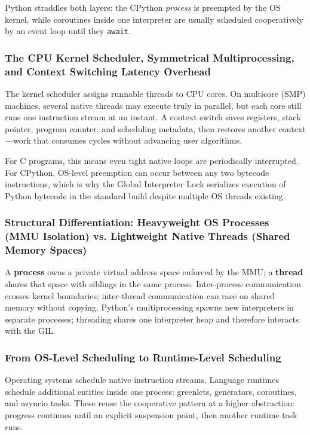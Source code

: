 \documentclass[a4paper,twoside]{report}
\begin{document}
Python straddles both layers: the CPython \emph{process} is preempted by the OS kernel, while coroutines inside one interpreter are usually scheduled cooperatively by an event loop until they \texttt{await}.

\subsubsection{The CPU Kernel Scheduler, Symmetrical Multiprocessing, and Context Switching Latency Overhead}

The kernel scheduler assigns runnable threads to CPU cores. On multicore (SMP) machines, several native threads may execute truly in parallel, but each core still runs one instruction stream at an instant. A context switch saves registers, stack pointer, program counter, and scheduling metadata, then restores another context---work that consumes cycles without advancing user algorithms.

For C programs, this means even tight native loops are periodically interrupted. For CPython, OS-level preemption can occur between any two bytecode instructions, which is why the Global Interpreter Lock serializes execution of Python bytecode in the standard build despite multiple OS threads existing.

\subsubsection{Structural Differentiation: Heavyweight OS Processes (MMU Isolation) vs. Lightweight Native Threads (Shared Memory Spaces)}

A \textbf{process} owns a private virtual address space enforced by the MMU; a \textbf{thread} shares that space with siblings in the same process. Inter-process communication crosses kernel boundaries; inter-thread communication can race on shared memory without copying. Python's multiprocessing spawns new interpreters in separate processes; threading shares one interpreter heap and therefore interacts with the GIL.

\subsubsection{From OS-Level Scheduling to Runtime-Level Scheduling}

Operating systems schedule native instruction streams. Language runtimes schedule additional entities inside one process: greenlets, generators, coroutines, and asyncio tasks. These reuse the cooperative pattern at a higher abstraction: progress continues until an explicit suspension point, then another runtime task runs.
\end{document}
